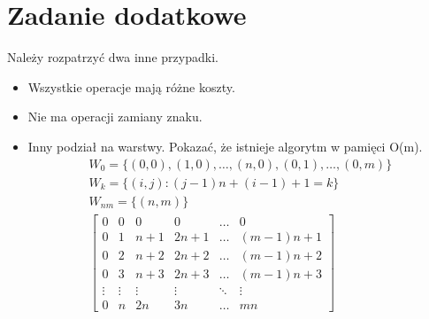 \documentclass[paper=a4, fontsize=11pt]{article}
\begin{document}
\section{Zadanie dodatkowe}
Należy rozpatrzyć dwa inne przypadki.
\begin{itemize}
\item Wszystkie operacje mają różne koszty.
\item Nie ma operacji zamiany znaku.
\item Inny podział na warstwy. Pokazać, że istnieje algorytm w pamięci O(m).
\begin{gather*}
W_0 = \{(0,0), (1,0), \dots ,(n, 0), (0, 1), \dots, (0, m) \} \\
W_k = \{(i,j) : (j-1)n + (i-1) + 1 = k\} \\
W_{nm} = \{(n, m) \} \\
\begin{bmatrix}
0 & 0 & 0 & 0 & \dots & 0 \\
0 & 1 & n + 1 & 2n + 1 & \dots & (m-1)n + 1 \\
0 & 2 & n + 2 & 2n + 2 & \dots & (m-1)n + 2 \\
0 & 3 & n + 3 & 2n + 3 & \dots & (m-1)n + 3\\
\vdots & \vdots & \vdots & \vdots & \ddots & \vdots \\
0 & n & 2n & 3n & \dots & mn
\end{bmatrix}
\end{gather*}
\end{itemize}
\end{document}
